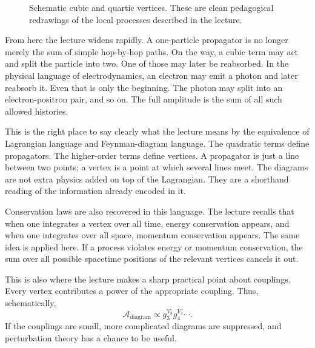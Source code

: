 \begin{figure}[h]
\centering
{}
\caption{Schematic cubic and quartic vertices. These are clean pedagogical redrawings of the local processes described in the lecture.}
\end{figure}

From here the lecture widens rapidly. A one-particle propagator is no longer merely the sum of simple hop-by-hop paths. On the way, a cubic term may act and split the particle into two. One of those may later be reabsorbed. In the physical language of electrodynamics, an electron may emit a photon and later reabsorb it. Even that is only the beginning. The photon may split into an electron-positron pair, and so on. The full amplitude is the sum of all such allowed histories.

This is the right place to say clearly what the lecture means by the equivalence of Lagrangian language and Feynman-diagram language. The quadratic terms define propagators. The higher-order terms define vertices. A propagator is just a line between two points; a vertex is a point at which several lines meet. The diagrams are not extra physics added on top of the Lagrangian. They are a shorthand reading of the information already encoded in it.

Conservation laws are also recovered in this language. The lecture recalls that when one integrates a vertex over all time, energy conservation appears, and when one integrates over all space, momentum conservation appears. The same idea is applied here. If a process violates energy or momentum conservation, the sum over all possible spacetime positions of the relevant vertices cancels it out.

This is also where the lecture makes a sharp practical point about couplings. Every vertex contributes a power of the appropriate coupling. Thus, schematically,
\begin{equation}
\mathcal{A}_{\mathrm{diagram}}\propto g_3^{V_3}g_4^{V_4}\cdots .
\end{equation}
If the couplings are small, more complicated diagrams are suppressed, and perturbation theory has a chance to be useful.

